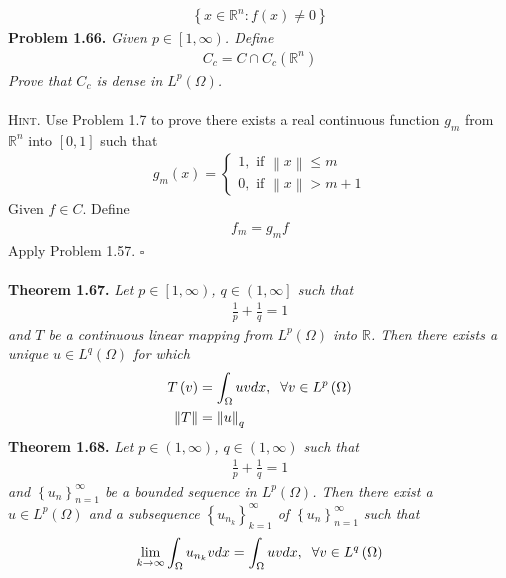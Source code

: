 \documentclass[a4paper]{article}
\numberwithin{equation}{section}
\begin{document}
\begin{align}
\left\{ {x \in {\mathbb{R}^n}:f\left( x \right) \ne 0} \right\}
\end{align}
\textbf{Problem 1.66.} \textit{Given $p\in \left[1,\infty\right)$. Define}
\begin{align}
{C_c} = C \cap {C_c}\left( {{\mathbb{R}^n}} \right)
\end{align}
\textit{Prove that $C_c$ is dense in $L^p\left(\Omega\right)$.}\\
\\
\textsc{Hint.} Use Problem 1.7 to prove there exists a real continuous function $g_m$ from $\mathbb{R}^n$ into $\left[0,1\right]$ such that
\begin{align}
{g_m}\left( x \right) = \left\{ {\begin{array}{*{20}{l}}
{1,\mbox{ if }\left\| x \right\| \le m}\\
{0,\mbox{ if }\left\| x \right\| > m + 1}
\end{array}} \right.
\end{align}
Given $f\in C$. Define 
\begin{align}
f_m=g_mf
\end{align}
Apply Problem 1.57. \hfill $\square$\\
\\
\textbf{Theorem 1.67.} \textit{Let $p\in \left[1,\infty\right)$, $q\in \left(1,\infty\right]$ such that}
\begin{align}
\frac{1}{p} + \frac{1}{q} = 1
\end{align}
\textit{and $T$ be a continuous linear mapping from $L^p\left(\Omega\right)$ into $\mathbb{R}$. Then there exists a unique $u\in L^q\left(\Omega\right)$ for which}
\begin{align}
T\left( v \right) &= \int_\Omega  {uvdx} ,\hspace{0.2cm}\forall v \in {L^p}\left( \Omega  \right)\\
\left\| T \right\| &= {\left\| u \right\|_q}
\end{align}
\textbf{Theorem 1.68.} \textit{Let $p\in \left(1,\infty\right)$, $q\in \left(1,\infty\right)$ such that}
\begin{align}
\frac{1}{p} + \frac{1}{q} = 1
\end{align}
\textit{and $\left\{ {{u_n}} \right\}_{n = 1}^\infty $ be a bounded sequence in $L^p\left(\Omega\right)$. Then there exist a $u\in L^p\left(\Omega\right)$ and a subsequence $\left\{ {{u_{{n_k}}}} \right\}_{k = 1}^\infty $ of $\left\{ {{u_n}} \right\}_{n = 1}^\infty $ such that}
\begin{align}
\mathop {\lim }\limits_{k \to \infty } \int_\Omega  {{u_{{n_k}}}vdx}  = \int_\Omega  {uvdx} ,\hspace{0.2cm}\forall v \in {L^q}\left( \Omega  \right)
\end{align}
\end{document}
